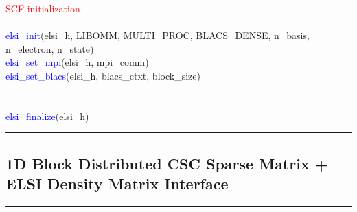 \documentclass{report}
\begin{document}
\begin{algorithm}[H]
\textcolor{red}{SCF initialization}\\
\hspace{0.3cm}\\
\textcolor{blue}{elsi\_init}(elsi\_h, LIBOMM, MULTI\_PROC, BLACS\_DENSE, n\_basis, n\_electron, n\_state)\\
\textcolor{blue}{elsi\_set\_mpi}(elsi\_h, mpi\_comm)\\
\textcolor{blue}{elsi\_set\_blacs}(elsi\_h, blacs\_ctxt, block\_size)\\
\hspace{0.3cm}\\
\hspace{0.3cm}\\
\textcolor{blue}{elsi\_finalize}(elsi\_h)\\
\end{algorithm}

\bigskip
\noindent\rule{18cm}{0.4pt}

\subsection{1D Block Distributed CSC Sparse Matrix + ELSI Density Matrix Interface}
\label{subsec:example_dm_csc}
\noindent\rule{18cm}{0.4pt}
\bigskip
\end{document}
